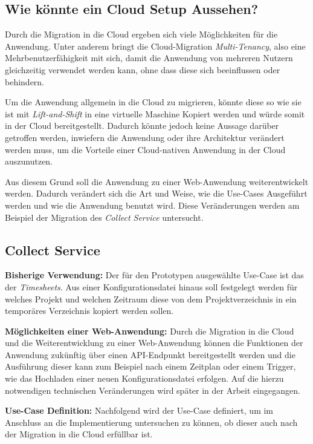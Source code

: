 \subsection{Wie könnte ein Cloud Setup Aussehen?}
Durch die Migration in die Cloud ergeben sich viele Möglichkeiten für die Anwendung. Unter anderem bringt die Cloud-Migration \textit{\gls{Multi-Tenancy}}, also eine Mehrbenutzerfähigkeit mit sich, damit die Anwendung von mehreren Nutzern gleichzeitig verwendet werden kann, ohne dass diese sich beeinflussen oder behindern.

Um die Anwendung allgemein in die Cloud zu migrieren, könnte diese so wie sie ist mit \textit{Lift-and-Shift} in eine virtuelle Maschine Kopiert werden und würde somit in der Cloud bereitgestellt. Dadurch könnte jedoch keine Aussage darüber getroffen werden, inwiefern die Anwendung oder ihre Architektur verändert werden muss, um die Vorteile einer Cloud-nativen Anwendung in der Cloud auszunutzen.

Aus diesem Grund soll die Anwendung zu einer Web-Anwendung weiterentwickelt werden. Dadurch verändert sich die Art und Weise, wie die Use-Cases Ausgeführt werden und wie die Anwendung benutzt wird. Diese Veränderungen werden am Beispiel der Migration des \textit{Collect Service} untersucht.

\subsection{Collect Service}
\textbf{Bisherige Verwendung:} Der für den Prototypen ausgewählte Use-Case ist das \grqq der \textit{\glspl{Timesheet}}. Aus einer Konfigurationsdatei hinaus soll festgelegt werden für welches Projekt und welchen Zeitraum diese von dem Projektverzeichnis in ein temporäres Verzeichnis kopiert werden sollen. 

\textbf{Möglichkeiten einer Web-Anwendung:} Durch die Migration in die Cloud und die Weiterentwicklung zu einer Web-Anwendung können die Funktionen der Anwendung zukünftig über einen API-Endpunkt bereitgestellt werden und die Ausführung dieser kann zum Beispiel nach einem Zeitplan oder einem Trigger, wie das Hochladen einer neuen Konfigurationsdatei erfolgen. Auf die hierzu notwendigen technischen Veränderungen wird später in der Arbeit eingegangen. \pagebreak

\textbf{Use-Case Definition:} Nachfolgend wird der Use-Case definiert, um im Anschluss an die Implementierung untersuchen zu können, ob dieser auch nach der Migration in die Cloud erfüllbar ist.

